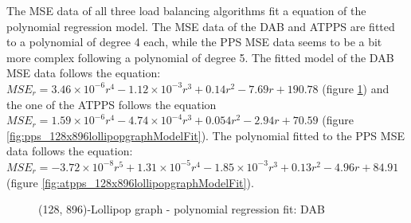 The MSE data of all three load balancing algorithms fit a equation of the polynomial regression model. The MSE data of the DAB and ATPPS are fitted to a polynomial of degree 4 each, while the PPS MSE data seems to be a bit more complex following a polynomial of degree 5. The fitted model of the DAB MSE data follows the equation: $MSE_r=3.46\times 10^{-6}r^{4}-1.12\times 10^{-3}r^{3}+0.14r^{2}-7.69r+190.78$ (figure \ref{fig:dab_128x896lollipopgraphModelFit}) and the one of the ATPPS follows the equation $MSE_r=1.59\times 10^{-6}r^{4}-4.74\times 10^{-4}r^{3}+0.054r^{2}-2.94r+70.59$ (figure \ref{fig:pps_128x896lollipopgraphModelFit}). The polynomial fitted to the PPS MSE data follows the equation: $MSE_r=-3.72\times 10^{-8}r^{5}+1.31\times 10^{-5}r^{4}-1.85\times 10^{-3}r^{3}+0.13r^{2}-4.96r+84.91$ (figure \ref{fig:atpps_128x896lollipopgraphModelFit}).
\begin{figure}[]
    \centering
    \caption{(128, 896)-Lollipop graph - polynomial regression fit: DAB}
    \label{fig:dab_128x896lollipopgraphModelFit}
\end{figure}

